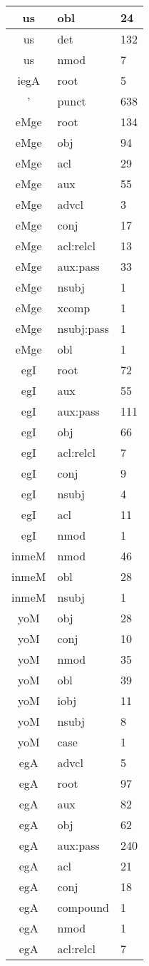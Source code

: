 \documentclass[a4 paper]{article}
\begin{document}
\begin{longtable}{cp{}p{}}
us & obl & 24\\ \midrule us & det & 132\\ \midrule us & nmod & 7\\ \midrule 
iegA & root & 5\\ \midrule 
' & punct & 638\\ \midrule 
eMge & root & 134\\ \midrule eMge & obj & 94\\ \midrule eMge & acl & 29\\ \midrule eMge & aux & 55\\ \midrule eMge & advcl & 3\\ \midrule eMge & conj & 17\\ \midrule eMge & acl:relcl & 13\\ \midrule eMge & aux:pass & 33\\ \midrule eMge & nsubj & 1\\ \midrule eMge & xcomp & 1\\ \midrule eMge & nsubj:pass & 1\\ \midrule eMge & obl & 1\\ \midrule 
egI & root & 72\\ \midrule egI & aux & 55\\ \midrule egI & aux:pass & 111\\ \midrule egI & obj & 66\\ \midrule egI & acl:relcl & 7\\ \midrule egI & conj & 9\\ \midrule egI & nsubj & 4\\ \midrule egI & acl & 11\\ \midrule egI & nmod & 1\\ \midrule 
inmeM & nmod & 46\\ \midrule inmeM & obl & 28\\ \midrule inmeM & nsubj & 1\\ \midrule 
yoM & obj & 28\\ \midrule yoM & conj & 10\\ \midrule yoM & nmod & 35\\ \midrule yoM & obl & 39\\ \midrule yoM & iobj & 11\\ \midrule yoM & nsubj & 8\\ \midrule yoM & case & 1\\ \midrule 
egA & advcl & 5\\ \midrule egA & root & 97\\ \midrule egA & aux & 82\\ \midrule egA & obj & 62\\ \midrule egA & aux:pass & 240\\ \midrule egA & acl & 21\\ \midrule egA & conj & 18\\ \midrule egA & compound & 1\\ \midrule egA & nmod & 1\\ \midrule egA & acl:relcl & 7\\ \midrule 

\end{longtable}
\end{document}

